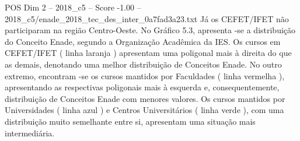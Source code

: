 \begin{textsample}{POS Dim 2 – 2018\_c5 – Score -1.00 – 2018\_c5/enade\_2018\_tec\_des\_inter\_0a7fad3a23.txt}
Já os CEFET/IFET não participaram na região Centro-Oeste.
No Gráfico 5.3, apresenta -se a distribuição do Conceito Enade, segundo a Organização Acadêmica da IES.
Os cursos em CEFET/IFET ( linha laranja ) apresentam uma poligonal mais à direita do que as demais, denotando uma melhor distribuição de Conceitos Enade.
No outro extremo, encontram -se os cursos mantidos por Faculdades ( linha vermelha ), apresentando as respectivas poligonais mais à esquerda e, consequentemente, distribuição de Conceitos Enade com menores valores.
Os cursos mantidos por Universidades ( linha azul ) e Centros Universitários ( linha verde ), com uma distribuição muito semelhante entre si, apresentam uma situação mais intermediária.

\end{textsample}
